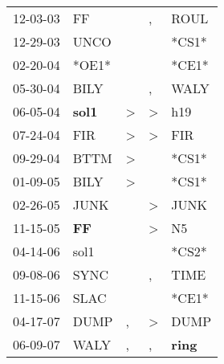 \begin{supertabular}{p{0.07\textwidth}p{0.06\textwidth}p{0.02\textwidth}p{0.02\textwidth}p{0.06\textwidth}}
 12-03-03\textsuperscript{} &             FF\textsuperscript{} &                  &                , &           ROUL\textsuperscript{} \\
 12-29-03\textsuperscript{} &           UNCO\textsuperscript{} &                  &                  &                            *CS1* \\
 02-20-04\textsuperscript{} &                            *OE1* &                  &                  &                            *CE1* \\
 05-30-04\textsuperscript{} &           BILY\textsuperscript{} &                  &                , &           WALY\textsuperscript{} \\
 06-05-04\textsuperscript{} &  \textbf{sol1\textsuperscript{}} &     \textgreater &     \textgreater &            h19\textsuperscript{} \\
 07-24-04\textsuperscript{} &            FIR\textsuperscript{} &     \textgreater &     \textgreater &            FIR\textsuperscript{} \\
 09-29-04\textsuperscript{} &           BTTM\textsuperscript{} &     \textgreater &                  &                            *CS1* \\
 01-09-05\textsuperscript{} &           BILY\textsuperscript{} &     \textgreater &                  &                            *CS1* \\
 02-26-05\textsuperscript{} &           JUNK\textsuperscript{} &                  &     \textgreater &           JUNK\textsuperscript{} \\
 11-15-05\textsuperscript{} &    \textbf{FF\textsuperscript{}} &                  &     \textgreater &             N5\textsuperscript{} \\
 04-14-06\textsuperscript{} &           sol1\textsuperscript{} &                  &                  &                            *CS2* \\
 09-08-06\textsuperscript{} &           SYNC\textsuperscript{} &                  &                , &           TIME\textsuperscript{} \\
 11-15-06\textsuperscript{} &           SLAC\textsuperscript{} &                  &                  &                            *CE1* \\
 04-17-07\textsuperscript{} &           DUMP\textsuperscript{} &                , &     \textgreater &           DUMP\textsuperscript{} \\
 06-09-07\textsuperscript{} &           WALY\textsuperscript{} &                , &                , &  \textbf{ring\textsuperscript{}} \\

\end{supertabular}
